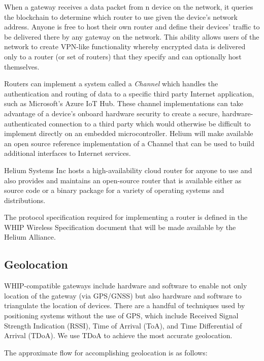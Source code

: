 \documentclass[10pt, nonatbib, nocopyrightspace, reprint]{sigplanconf}
\begin{document}
When a gateway receives a data packet from n device on the network, it queries the blockchain to determine which router to use given the device's network address. Anyone is free to host their own router and define their devices' traffic to be delivered there by any gateway on the network. This ability allows users of the network to create VPN-like functionality whereby encrypted data is delivered only to a router (or set of routers) that they specify and can optionally host themselves.

Routers can implement a system called a \emph{Channel} which handles the authentication and routing of data to a specific third party Internet application, such as Microsoft's Azure IoT Hub. These channel implementations can take advantage of a device's onboard hardware security to create a secure, hardware-authenticated connection to a third party which would otherwise be difficult to implement directly on an embedded microcontroller. Helium will make available an open source reference implementation of a Channel that can be used to build additional interfaces to Internet services.

Helium Systems Inc hosts a high-availability cloud router for anyone to use and also provides and maintains an open-source router that is available either as source code or a binary package for a variety of operating systems and distributions.

The protocol specification required for implementing a router is defined in the WHIP Wireless Specification document that will be made available by the Helium Alliance.

\subsection{Geolocation}\label{geolocation}

WHIP-compatible gateways include hardware and software to enable not only location of the gateway (via GPS/GNSS) but also hardware and software to triangulate the location of devices. There are a handful of techniques used by positioning systems without the use of GPS, which include Received Signal Strength Indication (RSSI), Time of Arrival (ToA), and Time Differential of Arrival (TDoA). We use TDoA to achieve the most accurate geolocation.

The approximate flow for accomplishing geolocation is as follows:
\end{document}
